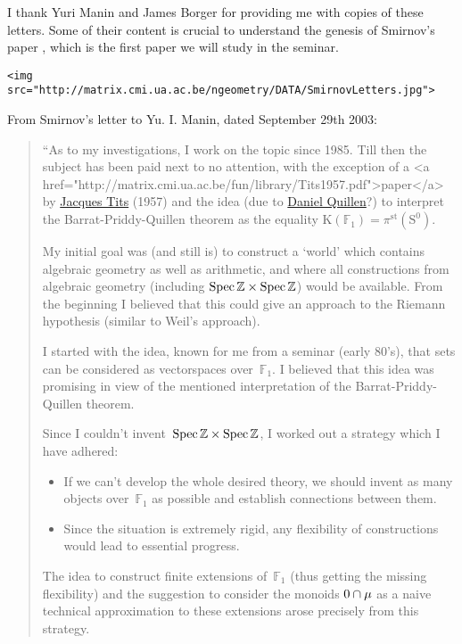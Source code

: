 I thank Yuri Manin and James Borger for providing me with copies of these letters. Some of their content is crucial to understand the genesis of Smirnov's paper \cite{hurwitz-inequalities-for-number-fields}, which is the first paper we will study in the seminar.

\verb|<img src="http://matrix.cmi.ua.ac.be/ngeometry/DATA/SmirnovLetters.jpg">|

From Smirnov's letter to Yu. I. Manin, dated September 29th 2003:

\begin{quote}
  ``As to my investigations, I work on the topic since 1985. Till then the subject has been paid next to no attention, with the exception of a <a href="http://matrix.cmi.ua.ac.be/fun/library/Tits1957.pdf">paper</a> by \href{http://en.wikipedia.org/wiki/Jacques_Tits}{Jacques Tits} (1957) and the idea (due to \href{http://en.wikipedia.org/wiki/Daniel_Quillen}{Daniel Quillen}?) to interpret the Barrat-Priddy-Quillen theorem as the equality $\mathrm{K}(\mathbb{F}_1)=\pi^{\mathrm{st}}(\mathrm{S}^0)$.

  My initial goal was (and still is) to construct a `world' which contains algebraic geometry as well as arithmetic, and where all constructions from algebraic geometry (including $\operatorname{Spec}\mathbb{Z}\times\operatorname{Spec}\mathbb{Z}$) would be available. From the beginning I believed that this could give an approach to the Riemann hypothesis (similar to Weil's approach).

  I started with the idea, known for me from a seminar (early 80's), that sets can be considered as vectorspaces over~$\mathbb{F}_1$. I believed that this idea was promising in view of the mentioned interpretation of the Barrat-Priddy-Quillen theorem.

  Since I couldn't invent~$\operatorname{Spec}\mathbb{Z}\times\operatorname{Spec}\mathbb{Z}$, I worked out a strategy which I have adhered:
  \begin{itemize}
    \item If we can't develop the whole desired theory, we should invent as many objects over~$\mathbb{F}_1$ as possible and establish connections between them.
    \item Since the situation is extremely rigid, any flexibility of constructions would lead to essential progress.
  \end{itemize}

  The idea to construct finite extensions of~$\mathbb{F}_1$ (thus getting the missing flexibility) and the suggestion to consider the monoids $0\cap\mathbf{\mu}$ as a naive technical approximation to these extensions arose precisely from this strategy.


\end{quote}
